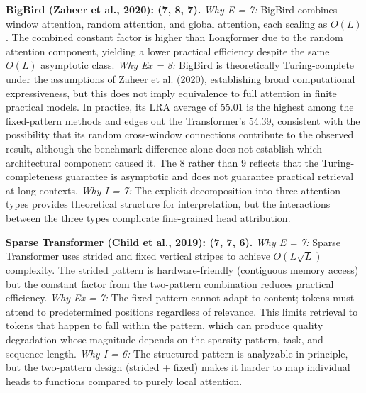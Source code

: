 \documentclass[10pt,twocolumn]{article}
\begin{document}
\textbf{BigBird (Zaheer et al., 2020): (7, 8, 7).}
\textit{Why E = 7:} BigBird combines window attention, random attention, and global attention, each scaling as $O(L)$. The combined constant factor is higher than Longformer due to the random attention component, yielding a lower practical efficiency despite the same $O(L)$ asymptotic class. \textit{Why Ex = 8:} BigBird is theoretically Turing-complete under the assumptions of Zaheer et al. (2020), establishing broad computational expressiveness, but this does not imply equivalence to full attention in finite practical models. In practice, its LRA average of 55.01 is the highest among the fixed-pattern methods and edges out the Transformer's 54.39, consistent with the possibility that its random cross-window connections contribute to the observed result, although the benchmark difference alone does not establish which architectural component caused it. The 8 rather than 9 reflects that the Turing-completeness guarantee is asymptotic and does not guarantee practical retrieval at long contexts. \textit{Why I = 7:} The explicit decomposition into three attention types provides theoretical structure for interpretation, but the interactions between the three types complicate fine-grained head attribution.

\textbf{Sparse Transformer (Child et al., 2019): (7, 7, 6).}
\textit{Why E = 7:} Sparse Transformer uses strided and fixed vertical stripes to achieve $O(L\sqrt{L})$ complexity. The strided pattern is hardware-friendly (contiguous memory access) but the constant factor from the two-pattern combination reduces practical efficiency. \textit{Why Ex = 7:} The fixed pattern cannot adapt to content; tokens must attend to predetermined positions regardless of relevance. This limits retrieval to tokens that happen to fall within the pattern, which can produce quality degradation whose magnitude depends on the sparsity pattern, task, and sequence length. \textit{Why I = 6:} The structured pattern is analyzable in principle, but the two-pattern design (strided + fixed) makes it harder to map individual heads to functions compared to purely local attention.
\end{document}
